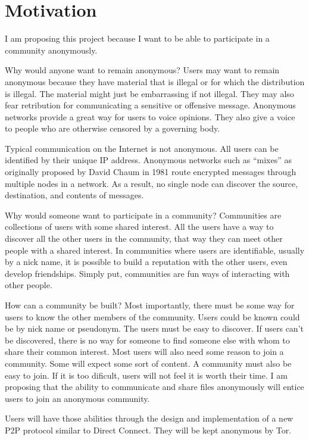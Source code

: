 \documentclass[12pt]{article}
\begin{document}
\section{Motivation}
I am proposing this project because I want to be able to participate in a community anonymously.

Why would anyone want to remain anonymous?  Users may want to remain anonymous because they have material that is illegal or for which the distribution is illegal.  The material might just be embarrassing if not illegal.  They may also fear retribution for communicating a sensitive or offensive message.  Anonymous networks provide a great way for users to voice opinions.  They also give a voice to people who are otherwise censored by a governing body.

Typical communication on the Internet is not anonymous.  All users can be identified by their unique IP address.  Anonymous networks such as ``mixes'' as originally proposed by David Chaum in 1981 route encrypted messages through multiple nodes in a network.  As a result, no single node can discover the source, destination, and contents of messages.

Why would someone want to participate in a community?  Communities are collections of users with some shared interest.  All the users have a way to discover all the other users in the community, that way they can meet other people with a shared interest.  In communities where users are identifiable, usually by a nick name, it is possible to build a reputation with the other users, even develop friendships.  Simply put, communities are fun ways of interacting with other people.

How can a community be built?  Most importantly, there must be some way for users to know the other members of the community.  Users could be known could be by nick name or pseudonym.  The users must be easy to discover.  If users can't be discovered, there is no way for someone to find someone else with whom to share their common interest.  Most users will also need some reason to join a community.  Some will expect some sort of content.  A community must also be easy to join.  If it is too dificult, users will not feel it is worth their time.  I am proposing that the ability to communicate and share files anonymously will entice users to join an anonymous community.

Users will have those abilities through the design and implementation of a new P2P protocol similar to Direct Connect.  They will be kept anonymous by Tor.
\end{document}
